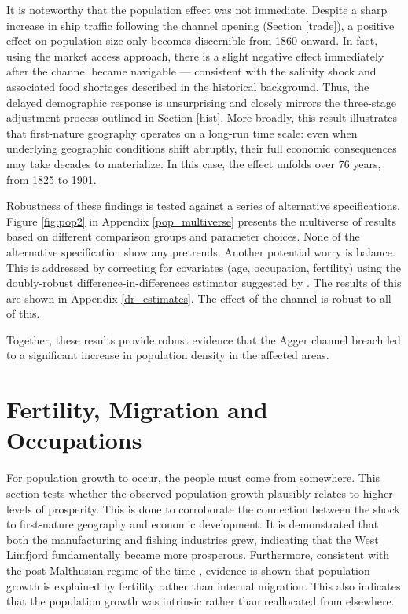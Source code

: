 \documentclass[12pt]{article}
\begin{document}
It is noteworthy that the population effect was not immediate. Despite a sharp increase in ship traffic following the channel opening (Section \ref{trade}), a positive effect on population size only becomes discernible from 1860 onward. In fact, using the market access approach, there is a slight negative effect immediately after the channel became navigable — consistent with the salinity shock and associated food shortages described in the historical background. Thus, the delayed demographic response is unsurprising and closely mirrors the three-stage adjustment process outlined in Section \ref{hist}. More broadly, this result illustrates that first-nature geography operates on a long-run time scale: even when underlying geographic conditions shift abruptly, their full economic consequences may take decades to materialize. In this case, the effect unfolds over 76 years, from 1825 to 1901.

Robustness of these findings is tested against a series of alternative specifications. Figure \ref{fig:pop2} in Appendix \ref{pop_multiverse} presents the multiverse of results based on different comparison groups and parameter choices. None of the alternative specification show any pretrends. Another potential worry is balance. This is addressed by correcting for covariates (age, occupation, fertility) using the doubly-robust difference-in-differences estimator suggested by \cite{Callaway2021did}. The results of this are shown in Appendix \ref{dr_estimates}. The effect of the channel is robust to all of this.

Together, these results provide robust evidence that the Agger channel breach led to a significant increase in population density in the affected areas.

\section{Fertility, Migration and Occupations} \label{further_res}

For population growth to occur, the people must come from somewhere. This section tests whether the observed population growth plausibly relates to higher levels of prosperity. This is done to corroborate the connection between the shock to first-nature geography and economic development. It is demonstrated that both the manufacturing and fishing industries grew, indicating that the West Limfjord fundamentally became more prosperous. Furthermore, consistent with the post-Malthusian regime of the time \citep{Jensen2022, Klemp2016}, evidence is shown that population growth is explained by fertility rather than internal migration. This also indicates that the population growth was intrinsic rather than reallocated from elsewhere.
\end{document}
